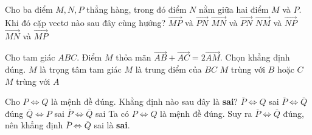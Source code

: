 \begin{ex}%
	Cho ba điểm $M,N,P$ thẳng hàng, trong đó điểm $N$ nằm giữa hai điểm $M$ và $P$. Khi đó cặp vectơ nào sau đây cùng hướng?
	\choice
	{$\overrightarrow{MP}$ và $\overrightarrow{PN}$}
	{$\overrightarrow{MN}$ và $\overrightarrow{PN}$}
	{$\overrightarrow{NM}$ và $\overrightarrow{NP}$}
	{\True $\overrightarrow{MN}$ và $\overrightarrow{MP}$}
\end{ex}
\begin{ex}%
	Cho tam giác $ABC$. Điểm $M$ thỏa mãn $\overrightarrow{AB}+\overrightarrow{AC}=2\overrightarrow{AM}$. Chọn khẳng định đúng.
	\choice
	{$M$ là trọng tâm tam giác}
	{\True $M$ là trung điểm của $BC$}
	{$M$ trùng với $B$ hoặc $C$}
	{$M$ trùng với $A$}
\end{ex}
\begin{ex}%
	Cho $P\Leftrightarrow Q$ là mệnh đề đúng. Khẳng định nào sau đây là \textbf{sai}?
	\choice
	{$\overline{P}\Leftrightarrow Q$ sai}
	{$\overline{P}\Leftrightarrow \overline{Q}$ đúng}
	{$\overline{Q}\Leftrightarrow P$ sai}
	{\True $\overline{P}\Leftrightarrow \overline{Q}$ sai}
	Ta có $P\Leftrightarrow Q$ là mệnh đề đúng. Suy ra $\overline{P}\Leftrightarrow \overline{Q}$ đúng, nên khẳng định $\overline{P}\Leftrightarrow \overline{Q}$ sai là \textbf{sai}. 
\end{ex}
